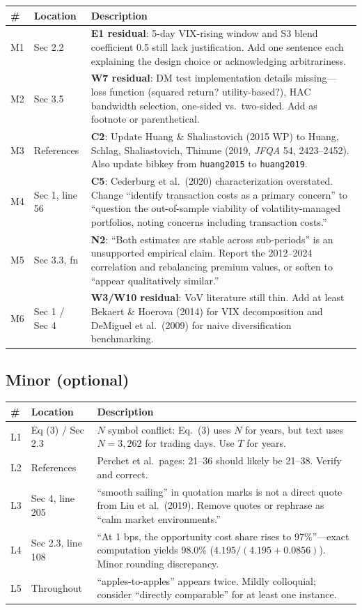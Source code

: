\documentclass[12pt,a4paper]{article}
\begin{document}
\begin{longtable}{p{0.6cm}p{2.5cm}p{10.5cm}}
\toprule
\# & Location & Description \\
\midrule
M1 & Sec 2.2 & \textbf{E1 residual}: 5-day VIX-rising window and S3 blend coefficient 0.5 still lack justification. Add one sentence each explaining the design choice or acknowledging arbitrariness. \\
\midrule
M2 & Sec 3.5 & \textbf{W7 residual}: DM test implementation details missing---loss function (squared return? utility-based?), HAC bandwidth selection, one-sided vs.\ two-sided. Add as footnote or parenthetical. \\
\midrule
M3 & References & \textbf{C2}: Update Huang \& Shaliastovich (2015 WP) to Huang, Schlag, Shaliastovich, Thimme (2019, \textit{JFQA} 54, 2423--2452). Also update bibkey from \texttt{huang2015} to \texttt{huang2019}. \\
\midrule
M4 & Sec 1, line 56 & \textbf{C5}: Cederburg et al.\ (2020) characterization overstated. Change ``identify transaction costs as a primary concern'' to ``question the out-of-sample viability of volatility-managed portfolios, noting concerns including transaction costs.'' \\
\midrule
M5 & Sec 3.3, fn & \textbf{N2}: ``Both estimates are stable across sub-periods'' is an unsupported empirical claim. Report the 2012--2024 correlation and rebalancing premium values, or soften to ``appear qualitatively similar.'' \\
\midrule
M6 & Sec 1 / Sec 4 & \textbf{W3/W10 residual}: VoV literature still thin. Add at least Bekaert \& Hoerova (2014) for VIX decomposition and DeMiguel et al.\ (2009) for naive diversification benchmarking. \\
\bottomrule
\end{longtable}

\subsection*{Minor (optional)}

\begin{longtable}{p{0.6cm}p{2.5cm}p{10.5cm}}
\toprule
\# & Location & Description \\
\midrule
L1 & Eq (3) / Sec 2.3 & $N$ symbol conflict: Eq.~(3) uses $N$ for years, but text uses $N = 3{,}262$ for trading days. Use $T$ for years. \\
\midrule
L2 & References & Perchet et al.\ pages: 21--36 should likely be 21--38. Verify and correct. \\
\midrule
L3 & Sec 4, line 205 & ``smooth sailing'' in quotation marks is not a direct quote from Liu et al.\ (2019). Remove quotes or rephrase as ``calm market environments.'' \\
\midrule
L4 & Sec 2.3, line 108 & ``At 1 bps, the opportunity cost share rises to 97\%''---exact computation yields 98.0\% ($4.195 / (4.195 + 0.0856)$). Minor rounding discrepancy. \\
\midrule
L5 & Throughout & ``apples-to-apples'' appears twice. Mildly colloquial; consider ``directly comparable'' for at least one instance. \\
\bottomrule
\end{longtable}
\end{document}
